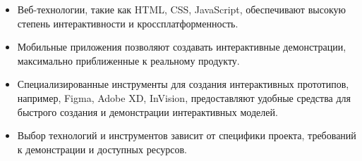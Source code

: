 \begin{enumerate}
\begin{itemize}
            \item Веб-технологии, такие как HTML, CSS, JavaScript, обеспечивают высокую степень интерактивности и кроссплатформенность.
            \item Мобильные приложения позволяют создавать интерактивные демонстрации, максимально приближенные к реальному продукту.
            \item Специализированные инструменты для создания интерактивных прототипов, например, Figma, Adobe XD, InVision, предоставляют удобные средства для быстрого создания и демонстрации интерактивных моделей.
            \item Выбор технологий и инструментов зависит от специфики проекта, требований к демонстрации и доступных ресурсов.
        \end{itemize}
\end{enumerate}

